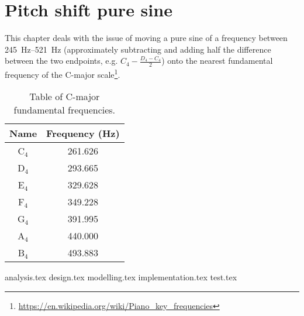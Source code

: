 
\chapter{Pitch shift pure sine}
\label{sec:puresine}

This chapter deals with the issue of moving a pure sine of a frequency between \SIrange{245}{521}{\hertz} (approximately subtracting and adding half the difference between the two endpoints, e.g. $C_4 -\frac{D_4 - C_4}{2}$) onto the nearest fundamental frequency of the C-major scale\footnote{\url{https://en.wikipedia.org/wiki/Piano_key_frequencies}}.

\begin{table}[H]
	\centering
	\begin{tabular}{c c}
		\toprule
		Name & Frequency (\si{\hertz}) \\
		\midrule
		C$_4$ & \num{261.626} \\
		D$_4$ & \num{293.665} \\
		E$_4$ & \num{329.628} \\
		F$_4$ & \num{349.228} \\
		G$_4$ & \num{391.995} \\
		A$_4$ & \num{440.000} \\
		B$_4$ & \num{493.883} \\
		\bottomrule
	\end{tabular}
	\caption{Table of C-major fundamental frequencies.}
	\label{tab:cmajor}
\end{table}

{analysis.tex}
{design.tex}
{modelling.tex}
{implementation.tex}
{test.tex}
